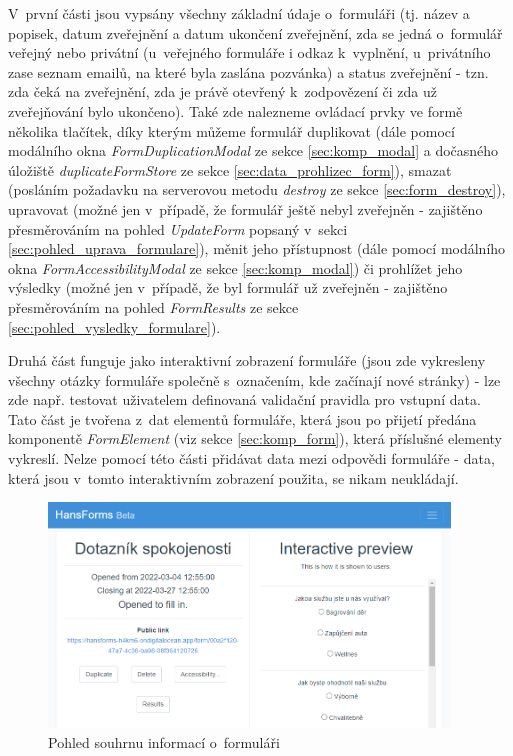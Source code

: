		V~první části jsou vypsány všechny základní údaje o~formuláři (tj. název a popisek, datum zveřejnění a datum ukončení zveřejnění, zda se jedná o~formulář veřejný nebo privátní (u~veřejného formuláře i odkaz k~vyplnění, u~privátního zase seznam emailů, na které byla zaslána pozvánka) a status zveřejnění - tzn. zda čeká na zveřejnění, zda je právě otevřený k~zodpovězení či zda už zveřejňování bylo ukončeno). Také zde nalezneme ovládací prvky ve formě několika tlačítek, díky kterým můžeme formulář duplikovat (dále pomocí modálního okna \textit{FormDuplicationModal} ze sekce \ref{sec:komp_modal} a dočasného úložiště \textit{duplicateFormStore} ze sekce \ref{sec:data_prohlizec_form}), smazat (posláním požadavku na serverovou metodu \textit{destroy} ze sekce \ref{sec:form_destroy}), upravovat (možné jen v~případě, že formulář ještě nebyl zveřejněn - zajištěno přesměrováním na pohled \textit{UpdateForm} popsaný v~sekci \ref{sec:pohled_uprava_formulare}), měnit jeho přístupnost (dále pomocí modálního okna \textit{FormAccessibilityModal} ze sekce \ref{sec:komp_modal}) či prohlížet jeho výsledky (možné jen v~případě, že byl formulář už zveřejněn - zajištěno přesměrováním na pohled \textit{FormResults} ze sekce \ref{sec:pohled_vysledky_formulare}).
		
		Druhá část funguje jako interaktivní zobrazení formuláře (jsou zde vykresleny všechny otázky formuláře společně s~označením, kde začínají nové stránky) - lze zde např. testovat uživatelem definovaná validační pravidla pro vstupní data. Tato část je tvořena z~dat elementů formuláře, která jsou po přijetí předána komponentě \textit{FormElement} (viz sekce \ref{sec:komp_form}), která příslušné elementy vykreslí. Nelze pomocí této části přidávat data mezi odpovědi formuláře - data, která jsou v~tomto interaktivním zobrazení použita, se nikam neukládají.
		
		\begin{figure}[h]
			\centering
			\includegraphics[width=0.95\textwidth]{img/pohledy/formpreview.png}
			\caption{Pohled souhrnu informací o~formuláři}
			\label{fig:pohled_formpreview}
		\end{figure}
		
